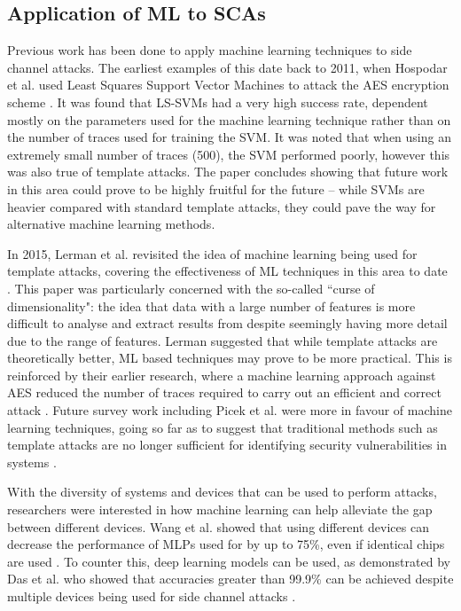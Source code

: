 \documentclass[a4paper,oneside,11pt]{article}
\begin{document}


\subsection{Application of ML to SCAs}
\label{sec:application-ml-scas}

Previous work has been done to apply machine learning techniques to side
channel attacks. The earliest examples of this date back to 2011, when Hospodar
et al. used Least Squares Support Vector Machines to attack the AES encryption
scheme \cite{A/Hospodar-2011-ML-Template}. It was found that LS-SVMs had a very
high success rate, dependent mostly on the parameters used for the machine
learning technique rather than on the number of traces used for training the
SVM. It was noted that when using an extremely small number of traces (500),
the SVM performed poorly, however this was also true of template attacks. The
paper concludes showing that future work in this area could prove to be highly
fruitful for the future -- while SVMs are heavier compared with standard
template attacks, they could pave the way for alternative machine learning
methods.

In 2015, Lerman et al. revisited the idea of machine learning being used for
template attacks, covering the effectiveness of ML techniques in this area to
date \cite{A/Lerman-2015-ML-Template}. This paper was particularly concerned
with the so-called ``curse of dimensionality": the idea that data with a large
number of features is more difficult to analyse and extract results from
despite seemingly having more detail due to the range of features. Lerman
suggested that while template attacks are theoretically better, ML based
techniques may prove to be more practical. This is reinforced by their earlier
research, where a machine learning approach against AES reduced the number of
traces required to carry out an efficient and correct attack
\cite{A/Lerman-2015-ML-AES}. Future survey work including Picek et al. were
more in favour of machine learning techniques, going so far as to suggest that
traditional methods such as template attacks are no longer sufficient for
identifying security vulnerabilities in systems \cite{A/Picek-2017-ML}.

With the diversity of systems and devices that can be used to perform attacks,
researchers were interested in how machine learning can help alleviate the gap
between different devices. Wang et al. showed that using different devices can
decrease the performance of MLPs used for by up to 75\%, even if identical
chips are used \cite{A/Wang-2019-ML}. To counter this, deep learning models can
be used, as demonstrated by Das et al. who showed that accuracies greater than
99.9\% can be achieved despite multiple devices being used for side channel
attacks \cite{A/Das-2019-DL}. 
\end{document}
